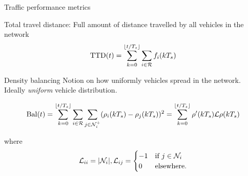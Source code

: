 \begin{frame}[shrink=8]{Traffic performance metrics}
    \begin{exampleblock}{Total travel distance:}
        Full amount of distance travelled by all vehicles in the network    
        \[
        \text{TTD}(t) = \sum_{k=0}^{\lfloor t/T_s\rfloor} \sum_{i\in\mathcal{R}}f_i(kT_s)
        \]
    \end{exampleblock}
    \begin{exampleblock}{Density balancing}
        Notion on how uniformly vehicles spread in the network. Ideally \emph{uniform} vehicle distribution. 
        
        \[
        \text{Bal}(t) = \sum_{k=0}^{\lfloor t/T_s\rfloor} \sum_{i\in\mathcal{R}}\sum_{j\in\mathcal{N}^+_i}(\rho_i(kT_s)-\rho_j(kT_s))^2
        = \sum_{k=0}^{\lfloor t/T_s\rfloor} \rho'(kT_s)\mathcal{L}\rho(kT_s)
        \]
        
        where
        \[
        \begin{aligned}
        \mathcal{L}_{ii} = \lvert \mathcal{N}_i \rvert, 
        \mathcal{L}_{ij} = \begin{cases} -1 & \text{if } j\in\mathcal{N}_i\\
                    0 & \text{elsewhere.}
            \end{cases}
        \end{aligned}
        \]
    \end{exampleblock}
\end{frame}